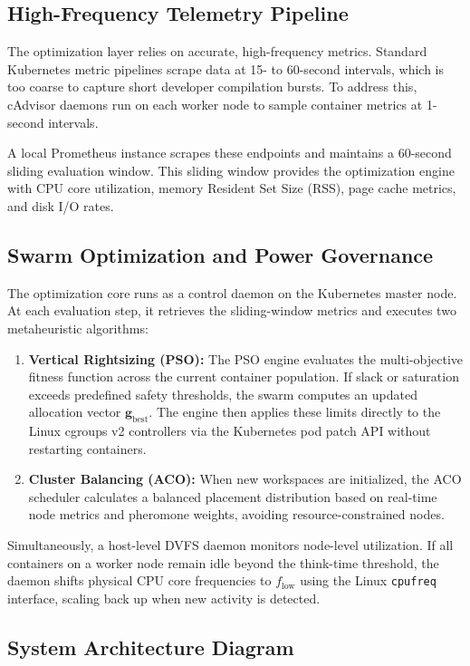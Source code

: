 \documentclass[12pt,a4paper]{report}
\begin{document}
	\subsection{High-Frequency Telemetry Pipeline}
	The optimization layer relies on accurate, high-frequency metrics. Standard Kubernetes metric pipelines scrape data at 15- to 60-second intervals, which is too coarse to capture short developer compilation bursts. To address this, cAdvisor daemons run on each worker node to sample container metrics at 1-second intervals.
	
	A local Prometheus instance scrapes these endpoints and maintains a 60-second sliding evaluation window. This sliding window provides the optimization engine with CPU core utilization, memory Resident Set Size (RSS), page cache metrics, and disk I/O rates.
	
	\subsection{Swarm Optimization and Power Governance}
	The optimization core runs as a control daemon on the Kubernetes master node. At each evaluation step, it retrieves the sliding-window metrics and executes two metaheuristic algorithms:
	\begin{enumerate}
		\item \textbf{Vertical Rightsizing (PSO):} The PSO engine evaluates the multi-objective fitness function across the current container population. If slack or saturation exceeds predefined safety thresholds, the swarm computes an updated allocation vector $\mathbf{g}_{\text{best}}$. The engine then applies these limits directly to the Linux cgroups v2 controllers via the Kubernetes pod patch API without restarting containers.
		\item \textbf{Cluster Balancing (ACO):} When new workspaces are initialized, the ACO scheduler calculates a balanced placement distribution based on real-time node metrics and pheromone weights, avoiding resource-constrained nodes.
	\end{enumerate}
	
	Simultaneously, a host-level DVFS daemon monitors node-level utilization. If all containers on a worker node remain idle beyond the think-time threshold, the daemon shifts physical CPU core frequencies to $f_{\text{low}}$ using the Linux \texttt{cpufreq} interface, scaling back up when new activity is detected.
	
	\clearpage
	\subsection{System Architecture Diagram}
	
\end{document}
